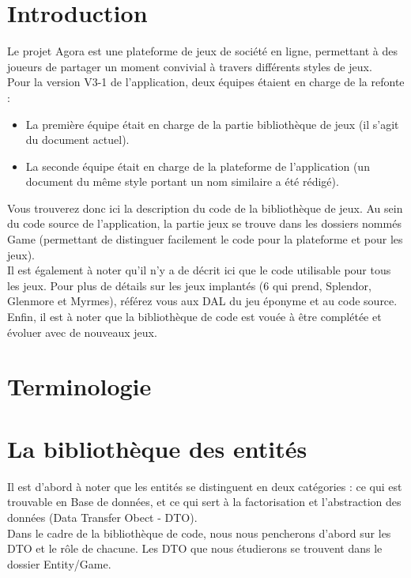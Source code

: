 \documentclass{article}
\begin{document}
    \section{Introduction}

    Le projet Agora est une plateforme de jeux de société en ligne, permettant à des joueurs de partager un moment convivial à travers différents styles de jeux.\\
    \indent Pour la version V3-1 de l'application, deux équipes étaient en charge de la refonte :
    \begin{itemize}
        \item La première équipe était en charge de la partie bibliothèque de jeux (il s'agit du document actuel).
        \item La seconde équipe était en charge de la plateforme de l'application (un document du même style portant un nom similaire a été rédigé).
    \end{itemize}

    Vous trouverez donc ici la description du code de la bibliothèque de jeux. Au sein du code source de l'application, la partie jeux se trouve dans les dossiers nommés Game (permettant de distinguer facilement le code pour la plateforme et pour les jeux).\\
    \indent Il est également à noter qu'il n'y a de décrit ici que le code utilisable pour tous les jeux. Pour plus de détails sur les jeux implantés (6 qui prend, Splendor, Glenmore et Myrmes), référez vous aux DAL du jeu éponyme et au code source. \\
    \indent Enfin, il est à noter que la bibliothèque de code est vouée à être complétée et évoluer avec de nouveaux jeux.

    \section{Terminologie}

    \newpage

    \section{La bibliothèque des entités}
            Il est d'abord à noter que les entités se distinguent en deux catégories : ce qui est trouvable en Base de données, et ce qui sert à la factorisation et l'abstraction des données (Data Transfer Obect - DTO).\\
            \indent Dans le cadre de la bibliothèque de code, nous nous pencherons d'abord sur les DTO et le rôle de chacune. Les DTO que nous étudierons se trouvent dans le dossier Entity/Game.
\end{document}
